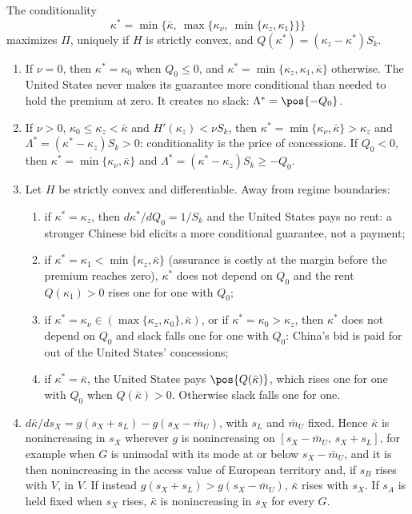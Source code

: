 \begin{proposition}\label{prop:conditionality}
The conditionality
\[ \kappa^*=\min\big\{\bar\kappa,\ \max\{\kappa_\nu,\ \min\{\kappa_z,\kappa_1\}\}\big\} \]
maximizes $\Pi$, uniquely if $H$ is strictly convex, and $Q(\kappa^*)=(\kappa_z-\kappa^*)S_k$.
\begin{enumerate}[label=(\alph*)]
\item If $\nu=0$, then $\kappa^*=\kappa_0$ when $Q_0\le 0$, and $\kappa^*=\min\{\kappa_z,\kappa_1,\bar\kappa\}$ otherwise. The United States never makes its guarantee more conditional than needed to hold the premium at zero. It creates no slack: $\Lambda^*=\pos{-Q_0}$.
\item If $\nu>0$, $\kappa_0\le\kappa_z<\bar\kappa$ and $H'(\kappa_z)<\nu S_k$, then $\kappa^*=\min\{\kappa_\nu,\bar\kappa\}>\kappa_z$ and $\Lambda^*=(\kappa^*-\kappa_z)S_k>0$: conditionality is the price of concessions. If $Q_0<0$, then $\kappa^*=\min\{\kappa_\nu,\bar\kappa\}$ and $\Lambda^*=(\kappa^*-\kappa_z)S_k\ge -Q_0$.
\item Let $H$ be strictly convex and differentiable. Away from regime boundaries:
  \begin{enumerate}[label=(\roman*)]
  \item if $\kappa^*=\kappa_z$, then $d\kappa^*/dQ_0=1/S_k$ and the United States pays no rent: a stronger Chinese bid elicits a more conditional guarantee, not a payment;
  \item if $\kappa^*=\kappa_1<\min\{\kappa_z,\bar\kappa\}$ (assurance is costly at the margin before the premium reaches zero), $\kappa^*$ does not depend on $Q_0$ and the rent $Q(\kappa_1)>0$ rises one for one with $Q_0$;
  \item if $\kappa^*=\kappa_\nu\in(\max\{\kappa_z,\kappa_0\},\bar\kappa)$, or if $\kappa^*=\kappa_0>\kappa_z$, then $\kappa^*$ does not depend on $Q_0$ and slack falls one for one with $Q_0$: China's bid is paid for out of the United States' concessions;
  \item if $\kappa^*=\bar\kappa$, the United States pays $\pos{Q(\bar\kappa)}$, which rises one for one with $Q_0$ when $Q(\bar\kappa)>0$. Otherwise slack falls one for one.
  \end{enumerate}
\item $d\bar\kappa/ds_X=g(s_X+s_L)-g(s_X-\bar m_U)$, with $s_L$ and $\bar m_U$ fixed. Hence $\bar\kappa$ is nonincreasing in $s_X$ wherever $g$ is nonincreasing on $[s_X-\bar m_U,\,s_X+s_L]$, for example when $G$ is unimodal with its mode at or below $s_X-\bar m_U$, and it is then nonincreasing in the access value of European territory and, if $s_B$ rises with $V$, in $V$. If instead $g(s_X+s_L)>g(s_X-\bar m_U)$, $\bar\kappa$ rises with $s_X$. If $s_A$ is held fixed when $s_X$ rises, $\bar\kappa$ is nonincreasing in $s_X$ for every $G$.
\end{enumerate}
\end{proposition}
